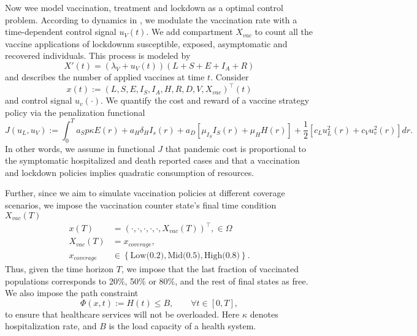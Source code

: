 Now wee model vaccination, treatment and lockdown as a optimal control problem.
According to dynamics in , we modulate the vaccination
rate with a time-dependent control signal  $u_V(t)$. We add
compartment $X_{vac}$
to count all the vaccine applications of lockdownm susceptible, exposed,
asymptomatic and
recovered individuals. This process is modeled by
\begin{equation}
\label{eqn:counter}
  X'(t) =
    (\lambda_V + u_V(t))(L + S + E + I_A + R)
\end{equation}
and describes the number of applied vaccines at time $t$.
Consider
$$x(t):= (L, S, E, I_S, I_A, H, R, D, V, X_{vac})^{\top}(t)$$
and  control signal $u_v(\cdot)$. We quantify the cost and reward of a vaccine
strategy policy via the penalization functional
\begin{equation}
    \label{eqn:cost_functional}
    J(u_L, u_V):=
        \int _0 ^ T
        a_S p \kappa E(r) +
        a_H \delta_H I_s(r) +
        a_D
        \left[
            \mu_{I_S} I_S(r) + \mu_H H(r)
        \right] +
        \frac{1}{2}
        \left[
            c_L u_L^2(r) +
            c_V u_v^2(r)
        \right]
        dr.
\end{equation}
In other words, we assume in functional $J$ that pandemic cost is proportional
to the symptomatic hospitalized and death reported cases and that a vaccination
and lockdown policies implies quadratic consumption of resources.

    Further, since we aim to simulate vaccination policies at different coverage
scenarios, we impose the vaccination counter state's final time condition
$X_{vac}(T)$
\begin{equation}
    \begin{aligned}
      x(T) &= (\cdot, \cdot, \cdot, \cdot, \cdot, X_{vac }(T))^{\top},
      \in \Omega
      \\
      X_{vac}(T)
        &= x_{cover age},
      \\
      x_{coverage}
        & \in
        \left \{
          \text{Low(0.2)},\text{Mid(0.5)}, \text{High(0.8)}
        \right \} .
    \end{aligned}
\end{equation}
    Thus, given the time horizon $T$, we impose that the last fraction of
vaccinated populations corresponds to 20\%, 50\% or 80\%, and
the rest of final states as free. We also impose the path constraint
\begin{equation}
    \label{eqn:path_constrain}
    \Phi(x,t):= H(t) \leq B,
    \qquad \forall t \in [0, T],
\end{equation}
to ensure that healthcare services will not be overloaded. Here $\kappa$
denotes hospitalization rate, and $B$ is the load capacity of a
health system.

